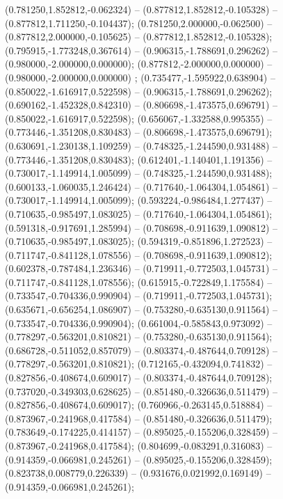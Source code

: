  (0.781250,1.852812,-0.062324) -- (0.877812,1.852812,-0.105328) -- (0.877812,1.711250,-0.104437);
 (0.781250,2.000000,-0.062500) -- (0.877812,2.000000,-0.105625) -- (0.877812,1.852812,-0.105328);
 (0.795915,-1.773248,0.367614) -- (0.906315,-1.788691,0.296262) -- (0.980000,-2.000000,0.000000);
 (0.877812,-2.000000,0.000000) -- (0.980000,-2.000000,0.000000) ;
 (0.735477,-1.595922,0.638904) -- (0.850022,-1.616917,0.522598) -- (0.906315,-1.788691,0.296262);
 (0.690162,-1.452328,0.842310) -- (0.806698,-1.473575,0.696791) -- (0.850022,-1.616917,0.522598);
 (0.656067,-1.332588,0.995355) -- (0.773446,-1.351208,0.830483) -- (0.806698,-1.473575,0.696791);
 (0.630691,-1.230138,1.109259) -- (0.748325,-1.244590,0.931488) -- (0.773446,-1.351208,0.830483);
 (0.612401,-1.140401,1.191356) -- (0.730017,-1.149914,1.005099) -- (0.748325,-1.244590,0.931488);
 (0.600133,-1.060035,1.246424) -- (0.717640,-1.064304,1.054861) -- (0.730017,-1.149914,1.005099);
 (0.593224,-0.986484,1.277437) -- (0.710635,-0.985497,1.083025) -- (0.717640,-1.064304,1.054861);
 (0.591318,-0.917691,1.285994) -- (0.708698,-0.911639,1.090812) -- (0.710635,-0.985497,1.083025);
 (0.594319,-0.851896,1.272523) -- (0.711747,-0.841128,1.078556) -- (0.708698,-0.911639,1.090812);
 (0.602378,-0.787484,1.236346) -- (0.719911,-0.772503,1.045731) -- (0.711747,-0.841128,1.078556);
 (0.615915,-0.722849,1.175584) -- (0.733547,-0.704336,0.990904) -- (0.719911,-0.772503,1.045731);
 (0.635671,-0.656254,1.086907) -- (0.753280,-0.635130,0.911564) -- (0.733547,-0.704336,0.990904);
 (0.661004,-0.585843,0.973092) -- (0.778297,-0.563201,0.810821) -- (0.753280,-0.635130,0.911564);
 (0.686728,-0.511052,0.857079) -- (0.803374,-0.487644,0.709128) -- (0.778297,-0.563201,0.810821);
 (0.712165,-0.432094,0.741832) -- (0.827856,-0.408674,0.609017) -- (0.803374,-0.487644,0.709128);
 (0.737020,-0.349303,0.628625) -- (0.851480,-0.326636,0.511479) -- (0.827856,-0.408674,0.609017);
 (0.760966,-0.263145,0.518884) -- (0.873967,-0.241968,0.417584) -- (0.851480,-0.326636,0.511479);
 (0.783649,-0.174225,0.414157) -- (0.895025,-0.155206,0.328459) -- (0.873967,-0.241968,0.417584);
 (0.804699,-0.083291,0.316083) -- (0.914359,-0.066981,0.245261) -- (0.895025,-0.155206,0.328459);
 (0.823738,0.008779,0.226339) -- (0.931676,0.021992,0.169149) -- (0.914359,-0.066981,0.245261);
